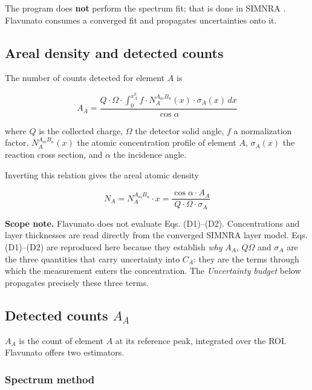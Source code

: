 The program does \textbf{not} perform the spectrum fit; that is done in
SIMNRA \citep{mayer1999simnra}. Flavunato consumes a converged fit and
propagates uncertainties onto it.

\subsection{Areal density and detected
counts}\label{areal-density-and-detected-counts}

The number of counts detected for element \(A\) is \citep[Eq.
1]{diallo2025iba}

\[
A_A = \frac{Q \cdot \Omega \cdot \int_0^{x_A^0} f \cdot N_A^{A_m B_n}(x) \cdot \sigma_A(x)\, dx}{\cos \alpha} \tag{D1}
\]

where \(Q\) is the collected charge, \(\Omega\) the detector solid
angle, \(f\) a normalization factor, \(N_A^{A_m B_n}(x)\) the atomic
concentration profile of element \(A\), \(\sigma_A(x)\) the reaction
cross section, and \(\alpha\) the incidence angle.

Inverting this relation gives the areal atomic density \citep[Eq.
2]{diallo2025iba}

\[
N_A = N_A^{A_m B_n} \cdot x = \frac{\cos \alpha \cdot A_A}{Q \cdot \Omega \cdot \sigma_A} \tag{D2}
\]

\textbf{Scope note.} Flavunato does not evaluate Eqs. (D1)--(D2).
Concentrations and layer thicknesses are read directly from the
converged SIMNRA layer model. Eqs. (D1)--(D2) are reproduced here
because they establish \emph{why} \(A_A\), \(Q\Omega\) and \(\sigma_A\)
are the three quantities that carry uncertainty into \(C_A\): they are
the terms through which the measurement enters the concentration. The
\emph{Uncertainty budget} below propagates precisely these three terms.

\subsection{\texorpdfstring{Detected counts
\(A_A\)}{Detected counts A\_A}}\label{detected-counts-a_a}

\(A_A\) is the count of element \(A\) at its reference peak, integrated
over the ROI. Flavunato offers two estimators.

\subsubsection{Spectrum method}\label{spectrum-method}

